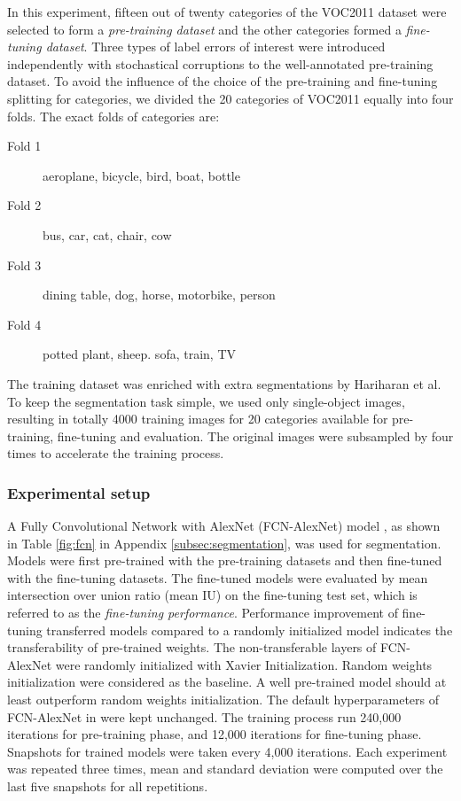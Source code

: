 In this experiment, fifteen out of twenty categories of the VOC2011 dataset were selected to form a \textit{pre-training dataset} and the other categories formed a \textit{fine-tuning dataset}.
Three types of label errors of interest were introduced independently with stochastical corruptions to the well-annotated pre-training dataset.
To avoid the influence of the choice of the pre-training and fine-tuning splitting for categories, we divided the 20 categories of VOC2011 equally into four folds.
The exact folds of categories are:
\begin{description}
  \item [Fold 1] aeroplane, bicycle, bird, boat, bottle
  \item [Fold 2] bus, car, cat, chair, cow
  \item [Fold 3] dining table, dog, horse, motorbike, person
  \item [Fold 4] potted plant, sheep. sofa, train, TV
\end{description}
The training dataset was enriched with extra segmentations by Hariharan et al. \cite{hariharan2011semantic}
To keep the segmentation task simple, we used only single-object images, resulting in totally 4000 training images for 20 categories available for pre-training, fine-tuning and evaluation.
The original images were subsampled by four times to accelerate the training process.



\subsubsection{Experimental setup}
\label{subsubsec:ptft}
A Fully Convolutional Network with AlexNet (FCN-AlexNet) model \cite{long2015fully}, as shown in Table \ref{fig:fcn} in Appendix \ref{subsec:segmentation}, was used for segmentation.
Models were first pre-trained with the pre-training datasets and then fine-tuned with the fine-tuning datasets.
The fine-tuned models were evaluated by mean intersection over union ratio (mean IU) on the fine-tuning test set, which is referred to as the \textit{fine-tuning performance}.
Performance improvement of fine-tuning transferred models compared to a randomly initialized model indicates the transferability of pre-trained weights.
The non-transferable layers of FCN-AlexNet were randomly initialized with Xavier Initialization.
Random weights initialization were considered as the baseline.
A well pre-trained model should at least outperform random weights initialization.
The default hyperparameters of FCN-AlexNet in  \cite{long2015fully} were kept unchanged.
The training process run 240,000 iterations for pre-training phase, and 12,000 iterations for fine-tuning phase.
Snapshots for trained models were taken every 4,000 iterations.
Each experiment was repeated three times, mean and standard deviation were computed over the last five snapshots for all repetitions.


